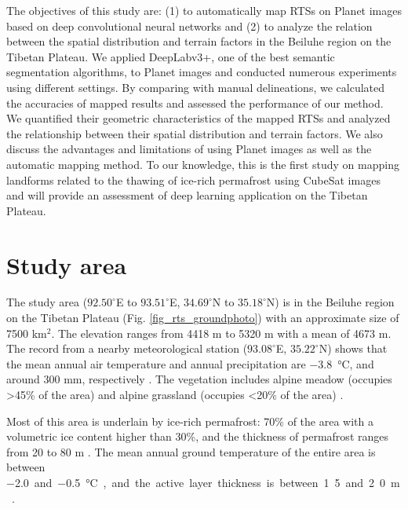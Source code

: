 \documentclass[preprint,12pt,authoryear]{elsarticle}
\begin{document}
The objectives of this study are: (1) to automatically map RTSs on Planet images based on deep convolutional neural networks and (2) to analyze the relation between the spatial distribution and terrain factors in the Beiluhe region on the Tibetan Plateau. We applied DeepLabv3+, one of the best semantic segmentation algorithms, to Planet images and conducted numerous experiments using different settings. By comparing with manual delineations, we calculated the accuracies of mapped results and assessed the performance of our method. We quantified their geometric characteristics of the mapped RTSs and analyzed the relationship between their spatial distribution and terrain factors. We also discuss the advantages and limitations of using Planet images as well as the automatic mapping method. 
To our knowledge, this is the first study on mapping landforms related to the thawing of ice-rich permafrost using CubeSat images and will provide an assessment of deep learning application on the Tibetan Plateau.


\section{Study area}
\label{sec_studyarea}
The study area ($92.50^\circ$E to $93.51^\circ$E, $34.69^\circ$N to $35.18^\circ$N) is in the Beiluhe region on the Tibetan Plateau (Fig. \ref{fig_rts_groundphoto}) with an approximate size of 7500 km$^2$. The elevation ranges from 4418 m to 5320 m with a mean of 4673 m. The record from a nearby meteorological station ($93.08^\circ$E, $35.22^\circ$N) shows that the mean annual air temperature and annual precipitation are \SI{-3.8}{\celsius}, and around 300 mm, respectively \citep{luo_thermokarst_2015}. The vegetation includes alpine meadow (occupies \textgreater 45\% of the area) and alpine grassland (occupies \textless 20\% of the area) \citep{luo_thermokarst_2015}. 

Most of this area is underlain by ice-rich permafrost: 70\% of the area with a volumetric ice content higher than 30\%, 
and the thickness of permafrost ranges from 20 to 80 m \citep{zhou_geocryology_2000, luo_thermokarst_2015}. The mean annual ground temperature of the entire area is between \SI{-2.0} and \SI{-0.5}{\celsius}, and the active layer thickness is between 1.5 and 2.0 m \citep{zhou_geocryology_2000, luo_thermokarst_2015, wu2010changes, wu2015changes}. %
\end{document}

